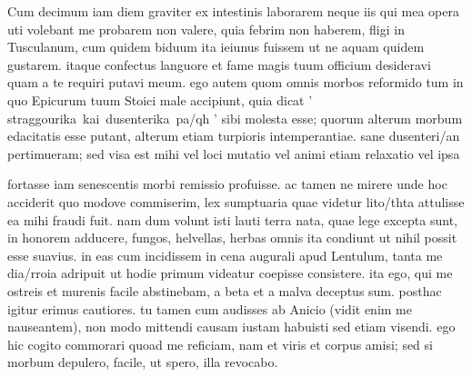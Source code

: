 


 Cum decimum iam diem graviter ex intestinis laborarem neque iis qui mea opera uti volebant me probarem non valere, quia febrim non haberem, fligi in Tusculanum, cum quidem biduum ita ieiunus fuissem ut ne aquam quidem gustarem. itaque confectus languore et fame magis tuum officium desideravi quam a te requiri putavi meum. ego autem quom omnis morbos reformido tum in quo Epicurum tuum Stoici male accipiunt, quia dicat ' straggourika\ kai\ dusenterika\ pa/qh ' sibi molesta esse; quorum alterum morbum edacitatis esse putant, alterum etiam turpioris intemperantiae. sane dusenteri/an pertimueram; sed visa est mihi vel loci mutatio vel animi etiam relaxatio vel ipsa

 fortasse iam senescentis morbi remissio profuisse. ac tamen ne mirere unde hoc acciderit quo modove commiserim, lex sumptuaria quae videtur lito/thta attulisse ea mihi fraudi fuit. nam dum volunt isti lauti terra nata, quae lege excepta sunt, in honorem adducere, fungos, helvellas, herbas omnis ita condiunt ut nihil possit esse suavius. in eas cum incidissem in cena augurali apud Lentulum, tanta me dia/rroia adripuit ut hodie primum videatur coepisse consistere. ita ego, qui me ostreis et murenis facile abstinebam, a beta et a malva deceptus sum. posthac igitur erimus cautiores. tu tamen cum audisses ab Anicio (vidit enim me nauseantem), non modo mittendi causam iustam habuisti sed etiam visendi. ego hic cogito commorari quoad me reficiam, nam et viris et corpus amisi; sed si morbum depulero, facile, ut spero, illa revocabo.
